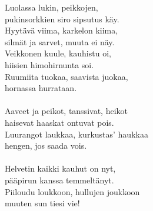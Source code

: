 
Luolassa lukin, peikkojen, \\ pukinsorkkien siro sipsutus käy. \\ Hyytävä viima, karkelon kiima, \\ silmät ja sarvet, muuta ei näy. \\ Veikkonen kuule, kauhistu oi, \\ hiisien himohirnunta soi. \\ Ruumiita tuokaa, saavista juokaa, \\ hornassa hurrataan. \\ \hspace{10mm} \\ Aaveet ja peikot, tanssivat, heikot \\ haisevat haaskat ontuvat pois. \\ Luurangot laukkaa, kurkustas' haukkaa \\ hengen, jos saada vois. \\ \hspace{10mm} \\ 
Helvetin kaikki kauhut on nyt, \\ pääpirun kanssa temmeltänyt. \\ Piiloudu loukkoon, hullujen joukkoon \\ muuten sun tiesi vie!